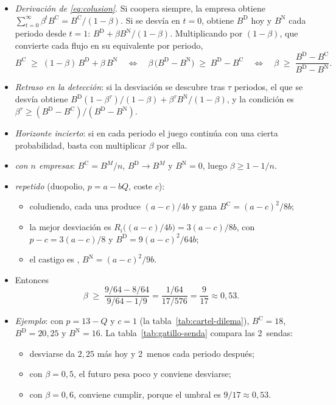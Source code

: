 \documentclass[11pt]{article}
\begin{document}
\begin{itemize}
\item \emph{Derivación de \eqref{eq:colusion}}. Si coopera siempre, la empresa obtiene $\sum_{t=0}^{\infty}\beta^tB^{\mathrm C}=B^{\mathrm C}/(1-\beta)$. Si se desvía en $t=0$, obtiene $B^{\mathrm D}$ hoy y $B^{\mathrm N}$ cada periodo desde $t=1$: $B^{\mathrm D}+\beta B^{\mathrm N}/(1-\beta)$. Multiplicando por $(1-\beta)$, que convierte cada flujo en su equivalente por periodo,
  \[
  B^{\mathrm C}\;\geq\;(1-\beta)\,B^{\mathrm D}+\beta\,B^{\mathrm N}\quad\Longleftrightarrow\quad\beta\,\big(B^{\mathrm D}-B^{\mathrm N}\big)\;\geq\;B^{\mathrm D}-B^{\mathrm C}\quad\Longleftrightarrow\quad\beta\;\geq\;\frac{B^{\mathrm D}-B^{\mathrm C}}{B^{\mathrm D}-B^{\mathrm N}}.
  \]
\item \emph{Retraso en la detección}: si la desviación se descubre tras $\tau$ periodos, el que se desvía obtiene $B^{\mathrm D}(1-\beta^{\tau})/(1-\beta)+\beta^{\tau}B^{\mathrm N}/(1-\beta)$, y la condición es $\beta^{\tau}\geq(B^{\mathrm D}-B^{\mathrm C})/(B^{\mathrm D}-B^{\mathrm N})$.
\item \emph{Horizonte incierto}: si en cada periodo el juego continúa con una cierta probabilidad, basta con multiplicar $\beta$ por ella.
\item \emph{ con $n$ empresas}: $B^{\mathrm C}=B^M/n$, $B^{\mathrm D}\to B^M$ y $B^{\mathrm N}=0$, luego $\beta\geq1-1/n$.
\item \emph{ repetido} (duopolio, $p=a-bQ$, coste $c$):
  \begin{itemize}
  \item coludiendo, cada una produce $(a-c)/4b$ y gana $B^{\mathrm C}=(a-c)^2/8b$;
  \item la mejor desviación es $R_i\big((a-c)/4b\big)=3(a-c)/8b$, con $p-c=3(a-c)/8$ y $B^{\mathrm D}=9(a-c)^2/64b$;
  \item el castigo es , $B^{\mathrm N}=(a-c)^2/9b$.
  \end{itemize}
\item Entonces
  \[
  \beta\;\geq\;\frac{9/64-8/64}{9/64-1/9}=\frac{1/64}{17/576}=\frac{9}{17}\approx0{,}53.
  \]
\item \emph{Ejemplo}: con $p=13-Q$ y $c=1$ (la tabla~\ref{tab:cartel-dilema}), $B^{\mathrm C}=18$, $B^{\mathrm D}=20{,}25$ y $B^{\mathrm N}=16$. La tabla~\ref{tab:gatillo-senda} compara las 2~sendas:
  \begin{itemize}
  \item desviarse da $2{,}25$ más hoy y 2~menos cada periodo después;
  \item con $\beta=0{,}5$, el futuro pesa poco y conviene desviarse;
  \item con $\beta=0{,}6$, conviene cumplir, porque el umbral es $9/17\approx0{,}53$.
  \end{itemize}
\end{itemize}
\end{document}
